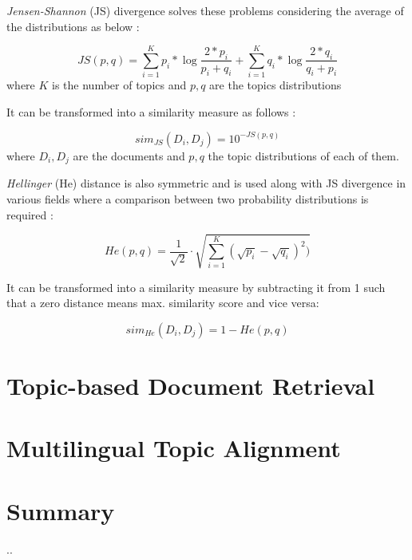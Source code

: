 \textit{Jensen-Shannon} (JS) divergence \cite{Rao1982}\cite{Lin1991} solves these problems considering the average of the distributions as below \cite{Celikyilmaz2010}:

\begin{equation}
JS(p,q) = \sum\limits_{i=1}^K p_{i}*\log \frac{2*p_{i}}{p_{i}+q_{i}}  +  \sum\limits_{i=1}^K q_{i}*\log \frac{2*q_{i}}{q_{i}+p_{i}}
\label{eq:jsdivergence}
\end{equation}
where  $K$ is the number of topics and $p,q$ are the topics distributions

It can be transformed into a similarity measure as follows \cite{Dagan1998} :

\begin{equation}
sim_{JS}(D_i , D_j) = 10^{- JS(p,q)}
\label{eq:simjs}
\end{equation}
where  $D_i,D_j$ are the documents and $p,q$ the topic distributions of each of them.


\textit{Hellinger} (He) distance is also symmetric and is used along with JS divergence in various fields where a comparison between two probability distributions is required \cite{Blei2007a} \cite{Hall2008} \cite{Boyd-Graber2010}:

\begin{equation}
	He(p, q) = \frac{1}{\sqrt{2}}\cdot\sqrt{\sum\limits_{i=1}^K (\sqrt{p_i} - \sqrt{q_i})^2)}
	\label{eq:hedistance}
\end{equation}

It can be transformed into a similarity measure by subtracting it from 1 \cite{Rus2013} such that a zero distance means max. similarity score and vice versa:

\begin{equation}
	sim_{He}(D_i, D_j) = 1 - He(p,q)
	\label{eq:simhe}
\end{equation}


\section{Topic-based Document Retrieval}


\section{Multilingual Topic Alignment}



\section{Summary}
..
